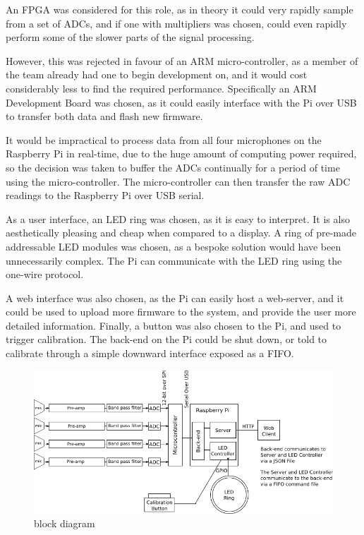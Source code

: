 \documentclass[a4paper]{article}
\begin{document}
An FPGA was considered for this role, as in theory it could very rapidly sample
from a set of ADCs, and if one with multipliers was chosen, could even rapidly
perform some of the slower parts of the signal processing.

However, this was rejected in favour of an ARM micro-controller, as a member of
the team already had one to begin development on, and it would cost considerably
less to find the required performance.  Specifically an ARM Development Board
was chosen, as it could easily interface with the Pi over USB to transfer both
data and flash new firmware.

It would be impractical to process data from all four microphones on the
Raspberry Pi in real-time, due to the huge amount of computing power required,
so the decision was taken to buffer the ADCs continually for a period of time
using the micro-controller. The micro-controller can then transfer the raw ADC
readings to the Raspberry Pi over USB serial.

As a user interface, an LED ring was chosen, as it is easy to interpret. It is
also aesthetically pleasing and cheap when compared to a display. A ring of
pre-made addressable LED modules was chosen, as a bespoke solution would have
been unnecessarily complex. The Pi can communicate with the LED ring using the
one-wire protocol.

A web interface was also chosen, as the Pi can easily host a web-server, and it
could be used to upload more firmware to the system, and provide the user more
detailed information.  Finally, a button was also chosen to the Pi, and used to
trigger calibration. The back-end on the Pi could be shut down, or told to
calibrate through a simple downward interface exposed as a FIFO.

\begin{figure}[H]
\begin{center}
\includegraphics[width=500pt]{appendixC/block_diagram.png}
\caption{block diagram}
\label{fig:blockdia}
\end{center}
\end{figure}
\end{document}
